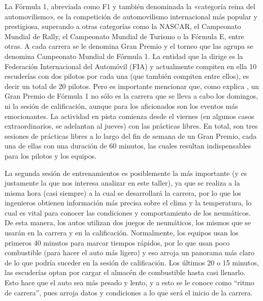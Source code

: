 La Fórmula 1, abreviada como F1 y también denominada la «categoría reina del automovilismo», es la competición de automovilismo internacional más popular y prestigiosa, superando a otras categorías como la NASCAR, el Campeonato Mundial de Rally, el Campeonato Mundial de Turismo o la Fórmula E, entre otras. A cada carrera se le denomina Gran Premio y el torneo que las agrupa se denomina Campeonato Mundial de Fórmula 1. La entidad que la dirige es la Federación Internacional del Automóvil (FIA) y actualmente compiten en ella 10 escuderías con dos pilotos por cada una (que también compiten entre ellos), es decir un total de 20 pilotos. Pero es importante mencionar que, como explica \textcite{ramirez22}, un Gran Premio de Fórmula 1 no sólo es la carrera que se lleva a cabo los domingos, ni la sesión de calificación, aunque para los aficionados son los eventos más emocionantes. La actividad en pista comienza desde el viernes (en algunos casos extraordinarios, se adelantan al jueves) con las prácticas libres. En total, son tres sesiones de prácticas libres a lo largo del fin de semana de un Gran Premio, cada una de ellas con una duración de 60 minutos, las cuales resultan indispensables para los pilotos y los equipos.

La segunda sesión de entrenamientos es posiblemente la más importante (y es justamente la que nos interesa analizar en este taller), ya que se realiza a la misma hora (casi siempre) a la cual se desarrollará la carrera, por lo que los ingenieros obtienen información más precisa sobre el clima y la temperatura, lo cual es vital para conocer las condiciones y comportamiento de los neumáticos. De esta manera, los autos utilizan dos juegos de neumáticos, los mismos que se usarán en la carrera y en la calificación. Normalmente, los equipos usan los primeros 40 minutos para marcar tiempos rápidos, por lo que usan poco combustible (para hacer el auto más ligero) y eso arroja un panorama más claro de lo que podría suceder en la sesión de calificación. Los últimos 20 o 15 minutos, las escuderías optan por cargar el almacén de combustible hasta casi llenarlo. Esto hace que el auto sea más pesado y lento, y a esto se le conoce como “ritmo de carrera”, pues arroja datos y condiciones a lo que será el inicio de la carrera.

